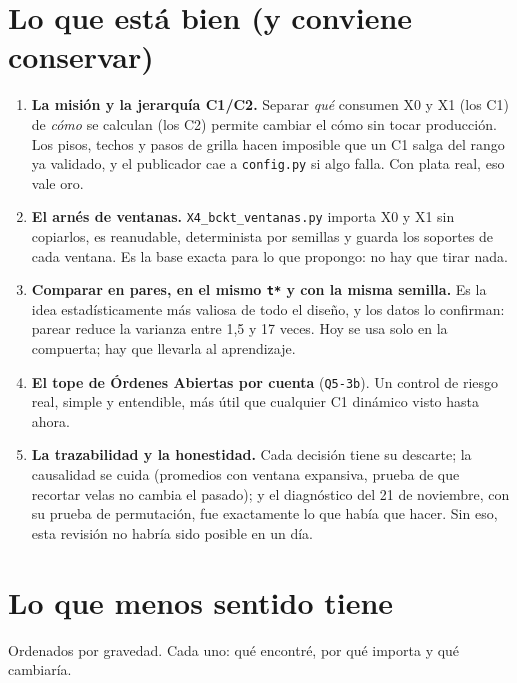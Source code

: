 \documentclass[11pt,a4paper]{article}
\newcommand{\code}[1]{\texttt{\small #1}}
\begin{document}
\section{Lo que está bien (y conviene conservar)}
\label{sec:bien}

\begin{enumerate}[leftmargin=1.4em]
  \item \textbf{La misión y la jerarquía C1/C2.} Separar \emph{qué} consumen X0 y X1 (los C1) de
        \emph{cómo} se calculan (los C2) permite cambiar el cómo sin tocar producción. Los pisos, techos y
        pasos de grilla hacen imposible que un C1 salga del rango ya validado, y el publicador cae a
        \code{config.py} si algo falla. Con plata real, eso vale oro.
  \item \textbf{El arnés de ventanas.} \code{X4\_bckt\_ventanas.py} importa X0 y X1 sin copiarlos, es
        reanudable, determinista por semillas y guarda los soportes de cada ventana. Es la base exacta para
        lo que propongo: no hay que tirar nada.
  \item \textbf{Comparar en pares, en el mismo \code{t*} y con la misma semilla.} Es la idea
        estadísticamente más valiosa de todo el diseño, y los datos lo confirman: parear reduce la varianza
        entre 1,5 y 17 veces. Hoy se usa solo en la compuerta; hay que llevarla al aprendizaje.
  \item \textbf{El tope de Órdenes Abiertas por cuenta} (\code{Q5-3b}). Un control de riesgo real, simple y
        entendible, más útil que cualquier C1 dinámico visto hasta ahora.
  \item \textbf{La trazabilidad y la honestidad.} Cada decisión tiene su descarte; la causalidad se cuida
        (promedios con ventana expansiva, prueba de que recortar velas no cambia el pasado); y el
        diagnóstico del 21 de noviembre, con su prueba de permutación, fue exactamente lo que había que
        hacer. Sin eso, esta revisión no habría sido posible en un día.
\end{enumerate}

\section{Lo que menos sentido tiene}
\label{sec:mal}

Ordenados por gravedad. Cada uno: qué encontré, por qué importa y qué cambiaría.
\end{document}
